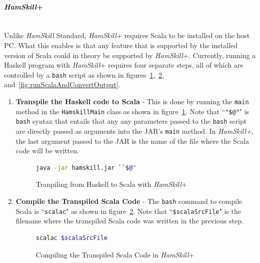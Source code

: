 \documentclass{report}
\newcommand{\myparagraph}[1]{\paragraph{#1}\mbox{}\\}
\begin{document}
\myparagraph{\textit{HamSkill}+}

Unlike \textit{HamSkill} Standard, \textit{HamSkill}+ requires Scala to be installed on the host PC.  What this enables is that any feature that is supported by the installed version of Scala could in theory be supported by \textit{HamSkill}+.  Currently, running a Haskell program with \textit{HamSkill}+ requires four separate steps, all of which are controlled by a \texttt{bash} script as shown in figures~\ref{fig:runHamSkill},~\ref{fig:compileScala}, and~\ref{fig:runScalaAndConvertOutput}.

\begin{enumerate}

\item \textbf{Transpile the Haskell code to Scala} - This is done by running the \texttt{main} method in the \texttt{HamskillMain} class as shown in figure~\ref{fig:runHamSkill}.  Note that ``\texttt{"\$@"}" is \texttt{bash} syntax that entails that any any parameters passed to the \texttt{bash} script are directly passed as arguments into the JAR's \texttt{main} method.  In \textit{HamSkill+}, the last argument passed to the JAR is the name of the file where the Scala code will be written.

\begin{figure}[H]
\begin{mdframed}
\begin{lstlisting}[language=bash]
java -jar hamskill.jar ``$@"
\end{lstlisting}
\end{mdframed}
\caption{Tranpiling from Haskell to Scala with \textit{HamSkill}+}\label{fig:runHamSkill}
\end{figure}

\item \textbf{Compile the Transpiled Scala Code} - The \texttt{bash} command to compile Scala is ``\texttt{scalac}" as shown in figure~\ref{fig:compileScala}.  Note that ``\texttt{\$scalaSrcFile}" is the filename where the transpiled Scala code was written in the previous step.

\begin{figure}[H]
\begin{mdframed}
\begin{lstlisting}[language=bash]
scalac $scalaSrcFile
\end{lstlisting}
\end{mdframed}
\caption{Compiling the Transpiled Scala Code in \textit{HamSkill}+}\label{fig:compileScala}
\end{figure}


\end{enumerate}
\end{document}
